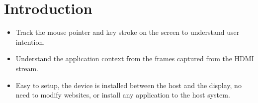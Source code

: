 \section{Introduction}
\label{sec:intro}

\begin{itemize}
  \item Track the mouse pointer and key stroke on the screen to understand user intention.
  \item Understand the application context from the frames captured from the HDMI stream.
  \item Easy to setup, the device is installed between the host and the display, no need to modify websites, or install any application to the host system.
\end{itemize}